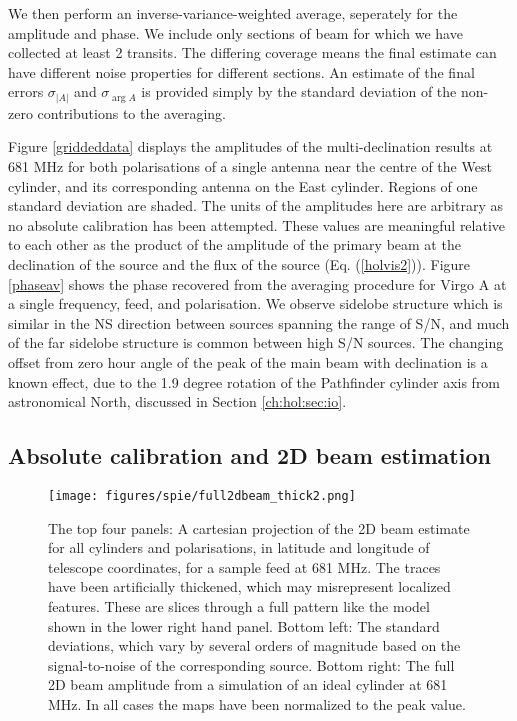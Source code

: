 We then perform an inverse-variance-weighted average, seperately for the amplitude and phase. We include only sections of beam for which we have collected at least 2 transits. The differing coverage means the final estimate can have different noise properties for different sections. An estimate of the final errors $\sigma_{|A|}$ and $\sigma_{\arg{A}}$ is provided simply by the standard deviation of the non-zero contributions to the averaging.

Figure \ref{griddeddata} displays the amplitudes of the multi-declination results at 681 MHz for both polarisations of a single antenna near the centre of the West cylinder, and its corresponding antenna on the East cylinder. Regions of one standard deviation are shaded. The units of the amplitudes here are arbitrary as no absolute calibration has been attempted. These values are meaningful relative to each other as the product of the amplitude of the primary beam at the declination of the source and the flux of the source (Eq. (\ref{holvis2})). Figure \ref{phaseav} shows the phase recovered from the averaging procedure for Virgo A at a single frequency, feed, and polarisation. We observe sidelobe structure which is similar in the NS direction between sources spanning the range of S/N, and much of the far sidelobe structure is common between high S/N sources. The changing offset from zero hour angle of the peak of the main beam with declination is a known effect, due to the 1.9 degree rotation of the Pathfinder cylinder axis from astronomical North, discussed in Section \ref{ch:hol:sec:io}.

\subsection{Absolute calibration and 2D beam estimation}

\begin{figure}[h!] %
	\centering
	\texttt{[image: figures/spie/full2dbeam\_thick2.png]}%
	\caption{The top four panels: A cartesian projection of the 2D beam estimate for all cylinders and polarisations, in latitude and longitude of telescope coordinates, for a sample feed at 681 MHz. The traces have been artificially thickened, which may misrepresent localized features. These are slices through a full pattern like the model shown in the lower right hand panel. Bottom left: The standard deviations, which vary by several orders of magnitude based on the signal-to-noise of the corresponding source. Bottom right: The full 2D beam amplitude from a simulation of an ideal cylinder at 681 MHz. In all cases the maps have been normalized to the peak value.}
	\label{2dbeamslices}
\end{figure}

